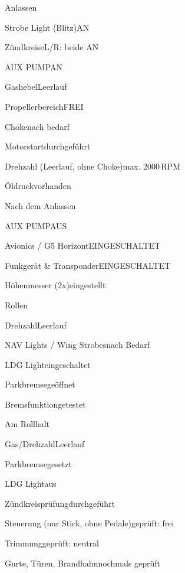 \begin{checklist}{Anlassen}
	\item{Strobe Light (Blitz)}{AN}
	\item{Zündkreise}{L/R: beide AN}
	\item{AUX PUMP}{AN}
	\item{Gashebel}{Leerlauf}
	\item{Propellerbereich}{FREI}
	\item{Choke}{nach bedarf}
	\item{Motorstart}{durchgeführt}
	\item{Drehzahl (Leerlauf, ohne Choke)}{max. 2000\,RPM}
	\item{Öldruck}{vorhanden}
\end{checklist}

\begin{checklist}{Nach dem Anlassen}
	\item{AUX PUMP}{AUS}
	\item{Avionics / G5 Horizont}{EINGESCHALTET}
	\item{Funkgerät \& Transponder}{EINGESCHALTET}
	\item{Höhenmesser (2x)}{eingestellt}
\end{checklist}



\begin{checklist}{Rollen}
	\item{Drehzahl}{Leerlauf}
	\item{NAV Lights / Wing Strobes}{nach Bedarf}
	\item{LDG Light}{eingeschaltet}
	\item{Parkbremse}{geöffnet}
	  \item{Bremsfunktion}{getestet}
\end{checklist}

\begin{checklist}{Am Rollhalt}
	\item{Gas/Drehzahl}{Leerlauf}
	\item{Parkbremse}{gesetzt}
	\item{LDG Light}{aus}
	\item{Zündkreisprüfung}{durchgeführt}
	\item{Steuerung (nur Stick, ohne Pedale)}{geprüft: frei}
	\item{Trimmung}{geprüft: neutral}
	\item{Gurte, Türen, Brandhahn}{nochmals geprüft}
\end{checklist}


